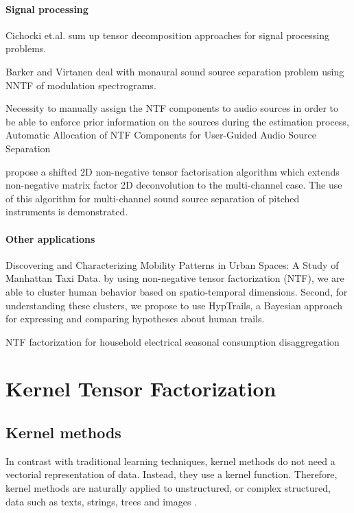 \documentclass[letterpaper,12pt]{article}
\begin{document}
\paragraph{Signal processing}

Cichocki et.al. \cite{Cichocki2015} sum up tensor decomposition approaches for signal processing problems.

Barker and Virtanen \cite{Barker2014} deal with monaural sound source separation problem using NNTF of modulation spectrograms.

\cite{Bilen2016} Necessity to manually assign the NTF components to audio sources in order to be able to enforce prior information on the sources during the estimation process, Automatic Allocation of NTF Components for User-Guided Audio Source Separation

\cite{Fitzgerald2006} propose a shifted 2D non-negative tensor factorisation algorithm which extends non-negative matrix factor 2D deconvolution to the multi-channel case. The use of this algorithm for multi-channel sound source separation of pitched instruments is demonstrated.

\paragraph{Other applications}

\cite{Espin-Noboa2016} Discovering and Characterizing Mobility Patterns in Urban Spaces: A Study of Manhattan Taxi Data. by using non-negative tensor factorization (NTF), we are able to cluster human behavior based on spatio-temporal dimensions. Second, for understanding these clusters, we propose to use HypTrails, a Bayesian approach for expressing and comparing hypotheses about human trails.

\cite{Figueiredo2014} NTF factorization for household electrical seasonal consumption disaggregation


 

 
 \section{Kernel Tensor Factorization}\label{sec:kernel}

 \subsection{Kernel methods}

In contrast with traditional learning techniques, kernel methods do not need a vectorial representation of data. Instead, they use a kernel function. Therefore, kernel methods are naturally applied to unstructured, or complex structured, data such as texts, strings, trees and images \cite{Shawe-Taylor2004}. 
\end{document}

